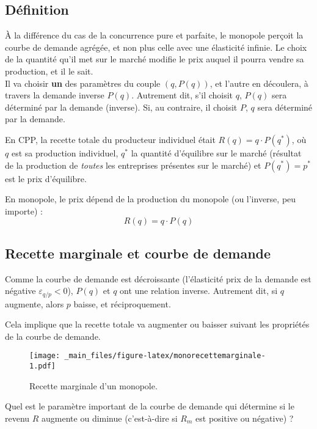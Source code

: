 \documentclass[
]{book}
\theoremstyle{definition}
\theoremstyle{definition}
\theoremstyle{definition}
\theoremstyle{definition}
\theoremstyle{remark}
\begin{document}
\hypertarget{duxe9finition}{%
\subsection{Définition}\label{duxe9finition}}

À la différence du cas de la concurrence pure et parfaite, le monopole perçoit la courbe de demande agrégée, et non plus celle avec une élasticité infinie.
Le choix de la quantité qu'il met sur le marché modifie le prix auquel il pourra vendre sa production, et il le sait.\\
Il va choisir \textbf{un} des paramètres du couple \((q, P(q))\), et l'autre en découlera, à travers la demande inverse \(P(q)\).
Autrement dit, s'il choisit \(q\), \(P(q)\) sera déterminé par la demande (inverse).
Si, au contraire, il choisit \(P\), \(q\) sera déterminé par la demande.

En CPP, la recette totale du producteur individuel était \(R(q) = q\cdot P(q^*)\), où \(q\) est sa production individuel, \(q^*\) la quantité d'équilibre sur le marché (résultat de la production de \emph{toutes} les entreprises présentes sur le marché) et \(P(q^*)=p^*\) est le prix d'équilibre.

En monopole, le prix dépend de la production du monopole (ou l'inverse, peu importe) :
\[
R(q) = q\cdot P(q)
\]

\hypertarget{recette-marginale-et-courbe-de-demande}{%
\subsection{Recette marginale et courbe de demande}\label{recette-marginale-et-courbe-de-demande}}

Comme la courbe de demande est décroissante (l'élasticité prix de la demande est négative \(\varepsilon_{q/p} <0\)), \(P(q)\) et \(q\) ont une relation inverse.
Autrement dit, si \(q\) augmente, alors \(p\) baisse, et réciproquement.

Cela implique que la recette totale va augmenter ou baisser suivant les propriétés de la courbe de demande.

\begin{figure}
\centering
\texttt{[image: \_main\_files/figure-latex/monorecettemarginale-1.pdf]}
\caption{\label{fig:monorecettemarginale}Recette marginale d'un monopole.}
\end{figure}

Quel est le paramètre important de la courbe de demande qui détermine si le revenu \(R\) augmente ou diminue (c'est-à-dire si \(R_m\) est positive ou négative) ?
\end{document}
